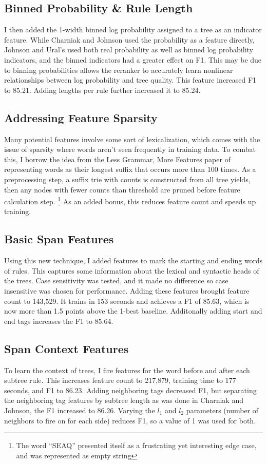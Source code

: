 \documentclass[11pt]{article}
\begin{document}
\subsection{Binned Probability \& Rule Length}
I then added the 1-width binned log probability assigned to a tree as an indicator feature.
While Charniak and Johnson used the probability as a feature directly,
Johnson and Ural's used both real probability as well as binned log probability indicators,
and the binned indicators had a greater effect on F1. This may be due to binning probabilities
allows the reranker to accurately learn nonlinear relationships between log probability and tree quality.
This feature increased F1 to 85.21. Adding lengths per rule further increased it to 85.24.

\subsection{Addressing Feature Sparsity}
Many potential features involve some sort of lexicalization, which comes with the issue of sparsity
where words aren't seen frequently in training data. To combat this, I borrow the idea from the
Less Grammar, More Features paper of representing words as their longest suffix that occurs more
than 100 times. As a preprocessing step, a suffix trie with counts is constructed from
all tree yields, then any nodes with fewer counts than threshold are pruned before feature calculation step.
\footnote{The word ``SEAQ'' presented itself as a frustrating yet interesting edge case, and was represented
as empty string} As an added bonus, this reduces feature count and speeds up training.

\subsection{Basic Span Features}
Using this new technique, I added features to mark the starting and ending words of rules.
This captures some information about the lexical and syntactic heads of the trees.
Case sensitivity was tested, and it made no difference so case insensitive was chosen for performance.
Adding these features brought feature count to 143,529. It trains in 153 seconds
and achieves a F1 of 85.63, which is now more than 1.5 points above the 1-best baseline.
Additonally adding start and end tags increases the F1 to 85.64.

\subsection{Span Context Features}
To learn the context of trees, I fire features for the word before and after each subtree rule.
This increases feature count to 217,879, training time to 177 seconds, and F1 to 86.23.
Adding neighboring tags decreased F1, but separating the neighboring tag features by subtree
length as was done in Charniak and Johnson, the F1 increased to 86.26. Varying the $l_1$ and $l_2$
parameters (number of neighbors to fire on for each side) reduces F1, so a value of 1 was used
for both.
\end{document}
